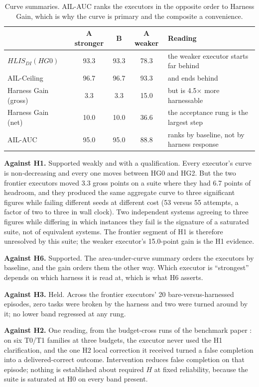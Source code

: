 \documentclass[11pt]{article}
\theoremstyle{definition}
\begin{document}
\begin{table}[!htbp]
\centering\small
\begin{tabularx}{\textwidth}{@{}lcccY@{}}
\toprule
& A stronger & B & A weaker & Reading \\
\midrule
$HLIS_{DI}(HG0)$ & 93.3 & 93.3 & 78.3 & the weaker executor starts far behind \\
AIL-Ceiling & 96.7 & 96.7 & 93.3 & and ends behind \\
Harness Gain (gross) & 3.3 & 3.3 & 15.0 & but is 4.5$\times$ more harnessable \\
Harness Gain (net) & 10.0 & 10.0 & 36.6 & the acceptance rung is the largest step \\
AIL-AUC & 95.0 & 95.0 & 88.8 & ranks by baseline, not by harness response \\
\bottomrule
\end{tabularx}
\caption{Curve summaries. AIL-AUC ranks the executors in the opposite order to Harness Gain, which is why the curve is primary and the composite a convenience.}
\label{tab:summary}
\end{table}

\textbf{Against H1.} Supported weakly and with a qualification. Every executor's curve is non-decreasing and every one moves between HG0 and HG2. But the two frontier executors moved 3.3 gross points on a suite where they had 6.7 points of headroom, and they produced the same aggregate curve to three significant figures while failing different seeds at different cost (53 versus 55 attempts, a factor of two to three in wall clock). Two independent systems agreeing to three figures while differing in which instances they fail is the signature of a saturated suite, not of equivalent systems. The frontier segment of H1 is therefore unresolved by this suite; the weaker executor's 15.0-point gain is the H1 evidence.

\textbf{Against H6.} Supported. The area-under-curve summary orders the executors by baseline, and the gain orders them the other way. Which executor is ``strongest'' depends on which harness it is read at, which is what H6 asserts.

\textbf{Against H3.} Held. Across the frontier executors' 20 bare-versus-harnessed episodes, zero tasks were broken by the harness and two were turned around by it; no lower band regressed at any rung.

\textbf{Against H2.} One reading, from the budget-cross runs of the benchmark paper \citep{yang2026uab}: on six T0/T1 families at three budgets, the executor never used the H1 clarification, and the one H2 local correction it received turned a false completion into a delivered-correct outcome. Intervention reduces false completion on that episode; nothing is established about required $H$ at fixed reliability, because the suite is saturated at H0 on every band present.
\end{document}
